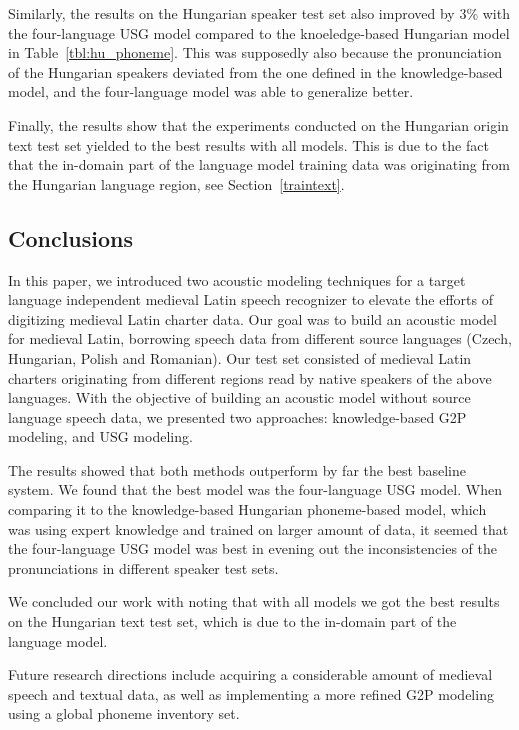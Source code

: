\documentclass[runningheads,a4paper]{llncs}
\begin{document}
Similarly, the results on the Hungarian speaker test set also improved by $3\%$ with the four-language USG model compared to the knoeledge-based Hungarian model in Table~\ref{tbl:hu_phoneme}.
This was supposedly also because the pronunciation of the Hungarian speakers deviated from the one defined in the knowledge-based model, and the four-language model was able to generalize better. 

Finally, the results show that the experiments conducted on the Hungarian origin text test set yielded to the best results with all models.
This is due to the fact that the in-domain part of the language model training data was originating from the Hungarian language region, see Section~\ref{traintext}.
\subsection{Conclusions}
In this paper, we introduced two acoustic modeling techniques for a target language independent medieval Latin speech recognizer to elevate the efforts of digitizing medieval Latin charter data.
Our goal was to build an acoustic model for medieval Latin, borrowing speech data from different source languages (Czech, Hungarian, Polish and Romanian).
Our test set consisted of medieval Latin charters originating from different regions read by native speakers of the above languages.
With the objective of building an acoustic model without source language speech data, we presented two approaches: knowledge-based G2P modeling, and USG modeling.

The results showed that both methods outperform by far the best baseline system. 
We found that the best model was the four-language USG model.
When comparing it to the knowledge-based Hungarian phoneme-based model, which was using expert knowledge and trained on larger amount of data, it seemed that the four-language USG model was best in evening out the inconsistencies of the pronunciations in different speaker test sets.

We concluded our work with noting that with all models we got the best results on the Hungarian text test set, which is due to the in-domain part of the language model.

Future research directions include acquiring a considerable amount of medieval speech and textual data, as well as implementing a more refined G2P modeling using a global phoneme inventory set.



\end{document}
